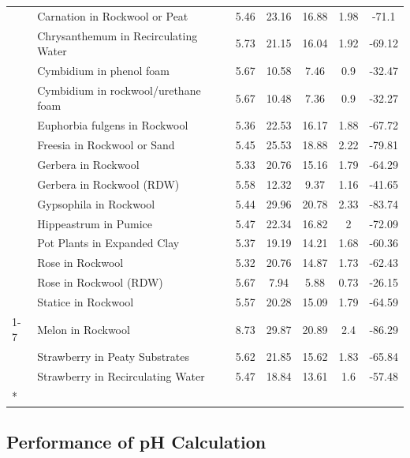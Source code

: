 \documentclass[
  letterpaper,
  DIV=11,
  numbers=noendperiod]{scrreprt}
\begin{document}
\begin{longtable}[t]{llccccc}
\nopagebreak
 & Carnation in Rockwool or Peat & 5.46 & 23.16 & 16.88 & 1.98 & -71.1\\
\nopagebreak
 & Chrysanthemum in Recirculating Water & 5.73 & 21.15 & 16.04 & 1.92 & -69.12\\
\nopagebreak
 & Cymbidium in phenol foam & 5.67 & 10.58 & 7.46 & 0.9 & -32.47\\
\nopagebreak
 & Cymbidium in rockwool/urethane foam & 5.67 & 10.48 & 7.36 & 0.9 & -32.27\\
\nopagebreak
 & Euphorbia fulgens in Rockwool & 5.36 & 22.53 & 16.17 & 1.88 & -67.72\\
\nopagebreak
 & Freesia in Rockwool or Sand & 5.45 & 25.53 & 18.88 & 2.22 & -79.81\\
\nopagebreak
 & Gerbera in Rockwool & 5.33 & 20.76 & 15.16 & 1.79 & -64.29\\
\nopagebreak
 & Gerbera in Rockwool (RDW) & 5.58 & 12.32 & 9.37 & 1.16 & -41.65\\
\nopagebreak
 & Gypsophila in Rockwool & 5.44 & 29.96 & 20.78 & 2.33 & -83.74\\
\nopagebreak
 & Hippeastrum in Pumice & 5.47 & 22.34 & 16.82 & 2 & -72.09\\
\nopagebreak
 & Pot Plants in Expanded Clay & 5.37 & 19.19 & 14.21 & 1.68 & -60.36\\
\nopagebreak
 & Rose in Rockwool & 5.32 & 20.76 & 14.87 & 1.73 & -62.43\\
\nopagebreak
 & Rose in Rockwool (RDW) & 5.67 & 7.94 & 5.88 & 0.73 & -26.15\\
\nopagebreak
\multirow[t]{-22}{*}{\raggedright\arraybackslash Floriculture} & Statice in Rockwool & 5.57 & 20.28 & 15.09 & 1.79 & -64.59\\
\cmidrule{1-7}\pagebreak[0]
 & Melon in Rockwool & 8.73 & 29.87 & 20.89 & 2.4 & -86.29\\
\nopagebreak
 & Strawberry in Peaty Substrates & 5.62 & 21.85 & 15.62 & 1.83 & -65.84\\
\nopagebreak
\multirow[t]{-3}{*}{\raggedright\arraybackslash Fruticulture} & Strawberry in Recirculating Water & 5.47 & 18.84 & 13.61 & 1.6 & -57.48\\*

\end{longtable}

\endgroup{}
\renewcommand{\arraystretch}{1}

\subsection{Performance of pH
Calculation}\label{performance-of-ph-calculation}
\end{document}
